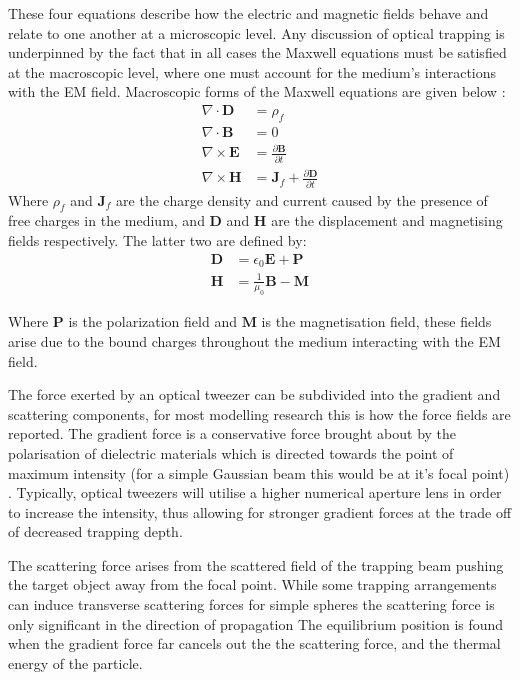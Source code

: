 These four equations describe how the electric and magnetic fields behave
and relate to one another at a microscopic level. Any discussion 
of optical trapping is underpinned by the fact that in all cases the 
Maxwell equations must be satisfied at the macroscopic level, where 
one must account for the medium's interactions with the EM field. 
Macroscopic forms of the Maxwell equations are given below \cite{Jackson_1975}:
\begin{align}
	\nabla \cdot \mathbf{D}
	&= \rho_f
	\\
	\nabla \cdot \mathbf{B}
	&= 0
	\\
	\nabla \times \mathbf{E}
	&= \frac{\partial \mathbf{B}}{\partial t}
	\\
	\nabla \times \mathbf{H}
	&= \mathbf{J}_f +\frac{\partial \mathbf{D}}{\partial t}  
\end{align}
Where $\rho_f$ and $\mathbf{J}_f$ are the charge density and current 
caused by the presence of free charges in the medium, and $\mathbf{D}$ 
and $\mathbf{H}$ are the displacement and magnetising fields respectively. 
The latter two are defined by:
\begin{align}
	\mathbf{D} &= \epsilon_0\mathbf{E}+\mathbf{P} 
	\\ 
	\mathbf{H} &= \frac{1}{\mu_0}\mathbf{B}-\mathbf{M}
\end{align}

Where $\mathbf{P}$ is the polarization field and $\mathbf{M}$ is the 
magnetisation field, these fields arise due to the bound charges 
throughout the medium interacting with the EM field. 

The force exerted by an optical tweezer can be subdivided into the 
gradient and scattering components, for most modelling research this 
is how the force fields are reported. The gradient force is a 
conservative force brought about by the polarisation of dielectric 
materials which is directed towards the point of maximum intensity 
(for a simple Gaussian beam this would be at it's focal point) 
\cite{YasuhiroHarada1996}. Typically, optical tweezers will utilise a
higher numerical aperture lens in order to increase the intensity, 
thus allowing for stronger gradient forces at the trade off of 
decreased trapping depth.

The scattering force arises from the scattered field of the trapping 
beam pushing the target object away from the focal point. While some 
trapping arrangements can induce transverse scattering forces for 
simple spheres the scattering force is only significant in the direction
of propagation \cite{Capitanio2002} The equilibrium position is found 
when the gradient force far cancels out the the scattering force, 
and the thermal energy of the particle. 

